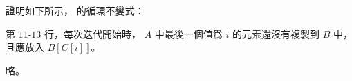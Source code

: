 \startEXERCISE
證明如下所示，  的循環不變式：

第 $11$-$13$ 行，每次迭代開始時，
 $A$ 中最後一個值爲 $i$ 的元素還沒有複製到 $B$ 中，
且應放入 $B[C[i]]$。
\stopEXERCISE

\startANSWER
略。
\stopANSWER
